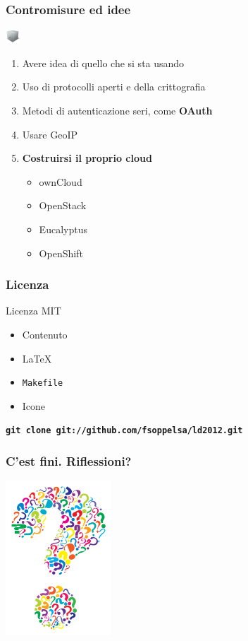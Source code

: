 \documentclass[xcolor=svgnames]{beamer}
\begin{document}
\begin{frame}
	\frametitle{Contromisure ed idee}

	\begin{block}{\includegraphics[width=20px]{img/safe.png}}
			\begin{enumerate}
					\item Avere idea di quello che si sta usando
						\pause
					\item Uso di protocolli aperti e della crittografia
						\pause
					\item Metodi di autenticazione seri, come {\bf OAuth}
						\pause
					\item Usare GeoIP
						\pause
					\item {\bf Costruirsi il proprio cloud}
						\pause
						\begin{itemize}
							\item ownCloud
								\pause
							\item OpenStack
								\pause
							\item Eucalyptus
								\pause
							\item OpenShift
						\end{itemize}
			\end{enumerate}
	\end{block}
\end{frame}

\begin{frame}
	\frametitle{Licenza}

	\begin{block}{Licenza MIT}
		\begin{itemize}
			\item Contenuto
			\item \LaTeX
			\item \texttt{Makefile}
			\item Icone
		\end{itemize}
	\end{block}

	\begin{center}
		{\bf \texttt{git clone git://github.com/fsoppelsa/ld2012.git}}
	\end{center}
\end{frame}

\begin{frame}
	\frametitle{C'est fini. Riflessioni?}

	\begin{center}
		\includegraphics[width=150px]{img/q.jpg}
	\end{center}
\end{frame}
\end{document}
